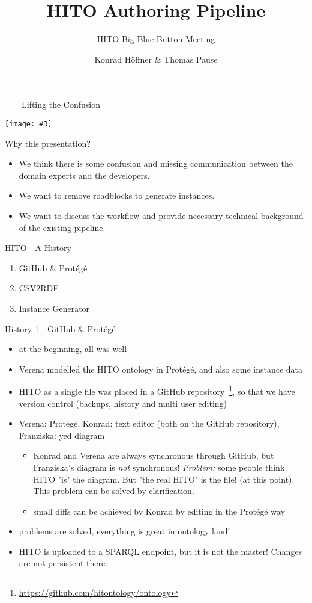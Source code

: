 \documentclass[aspectratio=1610]{beamer}
\title{HITO Authoring Pipeline}
\subtitle{HITO Big Blue Button Meeting}
\author{Konrad Höffner \& Thomas Pause}
\newcommand{\imageslide}[4][]
{
\begin{frame}[plain]{~~~~#2}
\vspace{0.2em}
\begin{center}
\centering\texttt{[image: \#3]}
\end{center}
#1
\note{#4}
\end{frame}
}
\begin{document}
\begin{frame}
\titlepage
\end{frame}

\imageslide{Lifting the Confusion}{confusion.pdf}{}

\begin{frame}{Why this presentation?}
\begin{itemize}
\item We think there is some confusion and missing communication between the domain experts and the developers.
\item We want to remove roadblocks to generate instances.
\item We want to discuss the workflow and provide necessary technical background of the existing pipeline.
\end{itemize}
\end{frame}

\begin{frame}{HITO---A History}
\begin{enumerate}
\item GitHub \& Protégé
\item CSV2RDF
\item Instance Generator
\end{enumerate}
\end{frame}

\begin{frame}{History 1---GitHub \& Protégé}
\begin{itemize}
  \item at the beginning, all was well
  \item Verena modelled the HITO ontology in Protégé, and also some instance data
  \item HITO as a single file was placed in a GitHub repository~\footnote{\url{https://github.com/hitontology/ontology}}, so that we have version control (backups, history and multi user editing)
  \item Verena: Protégé, Konrad: text editor (both on the GitHub repository), Franziska: yed diagram
\begin{itemize}
  \item Konrad and Verena are always synchronous through GitHub, but Franziska's diagram is \emph{not} synchronous! \emph{Problem:} some people think HITO "is" the diagram. But "the real HITO" is the file! (at this point). This problem can be solved by clarification.
  \item small diffs can be achieved by Konrad by editing in the Protégé way
\end{itemize}
  \item problems are solved, everything is great in ontology land!
  \item HITO is uploaded to a SPARQL endpoint, but it is not the master! Changes are not persistent there.
\end{itemize}
\end{frame}
\end{document}
